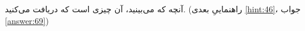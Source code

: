 \section{}
\paragraph{}\label{hint:172}
آنچه که می‌بینید، آن چیزی است که دریافت می‌کنید. (راهنماییِ بعدی \ref{hint:46}، جواب \ref{answer:69})